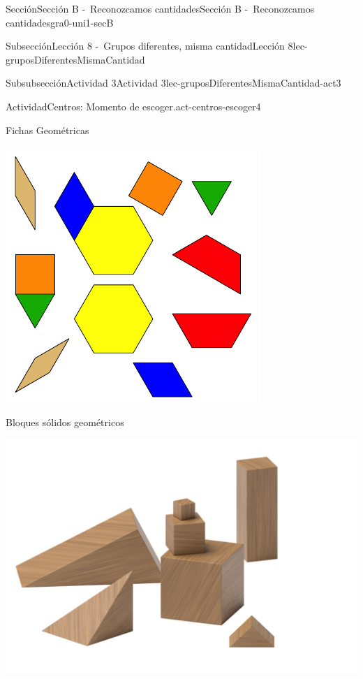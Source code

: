 \documentclass[twoside,10pt,]{article}
\begin{document}
\begin{sectionptx}{Sección}{Sección B -~Reconozcamos cantidades}{}{Sección B -~Reconozcamos cantidades}{}{}{gra0-uni1-secB}
\begin{subsectionptx}{Subsección}{Lección 8 -~Grupos diferentes, misma cantidad}{}{Lección 8}{}{}{lec-gruposDiferentesMismaCantidad}
\begin{subsubsectionptx}{Subsubsección}{Actividad 3}{}{Actividad 3}{}{}{lec-gruposDiferentesMismaCantidad-act3}
\begin{activity}{Actividad}{Centros: Momento de escoger.}{act-centros-escoger4}
\begin{sidebyside}{2}{0.025}{0.025}{0.05}
\begin{sbspanel}{0.45}
\end{sbspanel}%
\begin{sbspanel}{0.45}%
Fichas Geométricas%
\par
\includegraphics[width=\linewidth]{external/svg-source/tikz-file-147344.pdf}
\end{sbspanel}%
\end{sidebyside}%
\begin{sidebyside}{2}{0.025}{0.025}{0.05}%
\begin{sbspanel}{0.45}%
Bloques sólidos geométricos%
\par
\includegraphics[width=\linewidth]{external/png-source/K.1.A Beta Student Workbook.Geoblocks.png}

\end{sbspanel}
\end{sidebyside}
\end{activity}
\end{subsubsectionptx}
\end{subsectionptx}
\end{sectionptx}
\end{document}
